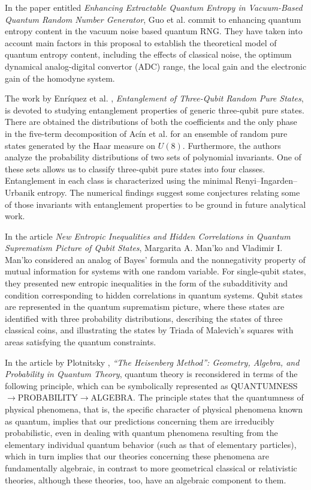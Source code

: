 \documentclass[entropy,editorial,accept,moreauthors,pdftex,10pt,a4paper]{Definitions/mdpi}
\begin{document}
In the paper entitled {\it Enhancing Extractable Quantum Entropy in Vacuum-Based Quantum Random Number Generator},
Guo et al. \cite{A4} commit to enhancing quantum entropy content in the vacuum noise based
quantum RNG. They have taken into account main factors in this proposal to establish the theoretical model of quantum entropy content, including
the effects of classical noise, the optimum dynamical analog-digital convertor (ADC) range, the local gain and the electronic
gain of the homodyne system. %

The work by Enr\'iquez et al. \cite{A5}, {\it Entanglement of Three-Qubit Random Pure States}, is devoted to
studying entanglement properties of generic three-qubit pure states. There are obtained the distributions of both the coefficients and the only phase in the
five-term decomposition of Ac\'in et al. for an ensemble of random pure states generated by the Haar measure on $U(8).$
Furthermore, the authors analyze the probability distributions of two sets of polynomial invariants. One of these sets allows us to classify three-qubit pure states into four classes.
Entanglement in each class is characterized using the minimal Renyi--Ingarden--Urbanik entropy.
The numerical findings suggest some conjectures relating some of those invariants with entanglement properties to be ground in future analytical work.

In the article {\it New Entropic Inequalities and Hidden Correlations in Quantum Suprematism Picture of Qubit States},   Margarita A. Man'ko and Vladimir I. Man'ko \cite{A6}
considered an analog of Bayes' formula and the nonnegativity property of mutual information for systems with one random variable.
For single-qubit states, they presented new entropic inequalities in the form of the subadditivity and condition corresponding to hidden correlations in quantum systems.
Qubit states  are represented in the quantum suprematism picture, where these states are identified with three probability distributions,
describing the states of three classical coins, and illustrating the states by Triada of Malevich's squares with areas satisfying the quantum constraints.

In the article by Plotnitsky \cite{A7},  {\it  ``The Heisenberg Method'': Geometry, Algebra, and Probability in Quantum Theory},
quantum theory is reconsidered in terms of the following principle, which can be symbolically represented as QUANTUMNESS$\to$PROBABILITY$\to$ALGEBRA.
The principle states that the quantumness of physical phenomena, that is, the specific character of physical phenomena known as quantum,
implies that our predictions concerning them are irreducibly probabilistic, even in dealing with quantum phenomena resulting from
the elementary individual quantum behavior (such as that of elementary particles), which in turn implies that our theories concerning these phenomena are fundamentally algebraic,
in contrast to more geometrical classical or relativistic theories, although these theories, too, have an algebraic component to them.
\end{document}
